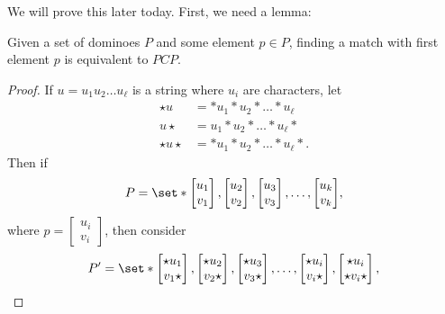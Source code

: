 \documentclass{standalone}
\begin{document}
We will prove this later today. First, we need a lemma:
\begin{lemma}
  Given a set of dominoes \(P\) and some element \(p \in P\), finding a match with first element \(p\) is equivalent to \(\mathit{PCP}\).
\end{lemma}
\begin{proof}
  If \(u = u_1 u_2 \dots u_\ell\) is a string where \(u_i\) are characters, let
  \begin{align*}
    \star u &= * u_1 * u_2 * \dots * u_\ell \\
    u \star &= u_1 * u_2 * \dots * u_\ell * \\
    \star u \star &= * u_1 * u_2 * \dots * u_\ell *.
  \end{align*}
  Then if
  \[
    P = \set*{
      \begin{bmatrix} u_1 \\ v_1 \end{bmatrix},
      \begin{bmatrix} u_2 \\ v_2 \end{bmatrix},
      \begin{bmatrix} u_3 \\ v_3 \end{bmatrix}, \dots,
      \begin{bmatrix} u_k \\ v_k \end{bmatrix}
    },
  \]
  where \(p = \begin{bmatrix} u_i \\ v_i \end{bmatrix}\), then consider
  \[
    P' = \set*{
      \begin{bmatrix} \star u_1 \\ v_1 \star \end{bmatrix},
      \begin{bmatrix} \star u_2 \\ v_2 \star \end{bmatrix},
      \begin{bmatrix} \star u_3 \\ v_3 \star \end{bmatrix}, \dots,
      \begin{bmatrix} \star u_i \\ v_i \star \end{bmatrix},
      \begin{bmatrix} \star u_i \\ \star v_i \star \end{bmatrix},
}\]
\end{proof}
\end{document}
